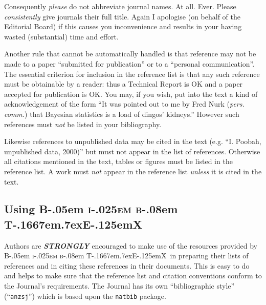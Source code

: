 \documentclass[times, doublespace]{anzsauth}
\newcommand\BibTeX{{\rmfamily B\kern-.05em \textsc{i\kern-.025em b}\kern-.08em
T\kern-.1667em\lower.7ex\hbox{E}\kern-.125emX}}
\begin{document}
Consequently \emph{please} do not abbreviate journal names.  At all.
Ever.  Please \emph{consistently} give journals their full title.
Again I apologise (on behalf of the Editorial Board) if this causes
you inconvenience and results in your having wasted (substantial)
time and effort.

Another rule that cannot be automatically handled is that reference
may not be made to a paper ``submitted for publication'' or to a
``personal communication''. The essential criterion for inclusion
in the reference list is that any such reference must be obtainable
by a reader: thus a Technical Report is OK and a paper accepted for
publication is OK.  You may, if you wish, put into the text a kind
of acknowledgement of the form ``It was pointed out to me by Fred
Nurk (\textit{pers. comm.}) that Bayesian statistics is a load
of dingos' kidneys.''  However such references must \emph{not}
be listed in your bibliography.

Likewise references to unpublished data may be cited in the text
(e.g. ``I. Poobah, unpublished data, 2000)'' but must not appear in
the list of references.  Otherwise all citations mentioned in the
text, tables or figures must be listed in the reference list. A
work must \emph{not} appear in the reference list \emph{unless}
it is cited in the text.

\subsection{Using \BibTeX}
\label{sec:useBib}

Authors are \textbf{\textit{STRONGLY}} encouraged to make use of
the resources provided by \BibTeX\ in preparing their lists of references
and in citing these references in their documents.  This is easy
to do and helps to make sure that the reference list and citation
conventions conform to the Journal's requirements.  The Journal
has its own ``bibliographic style'' (``\texttt{anzsj}'') which is
based upon the \texttt{natbib} package.
\end{document}
